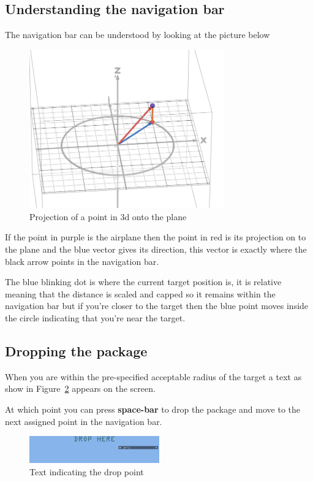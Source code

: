 \subsection{Understanding the navigation bar}
The navigation bar can be understood by looking at the picture below
\begin{figure}[H]
    \centering
    \includegraphics[width=0.75\textwidth]{images/figure1.png}
    \caption{Projection of a point in 3d onto the plane}
    \label{fig:projection}
\end{figure}


If the point in purple is the airplane then the point in red is its projection on to the plane and the blue vector gives its direction, this vector is exactly where the black arrow points in the navigation bar.

The blue blinking dot is where the current target position is, it is relative meaning that the distance is scaled and capped so it remains within the navigation bar but if you're closer to the target then the blue point moves inside the circle indicating that you're near the target.


\subsection{Dropping the package}

When you are within the pre-specified acceptable radius of the target a text as show in Figure~\ref{fig:drop_text} appears on the screen.

At which point you can press \textbf{space-bar} to drop the package and move to the next assigned point in the navigation bar.


\begin{figure}[H]
    \centering
    \includegraphics[width=0.5\textwidth]{images/figure2.png}
    \caption{Text indicating the drop point}
    \label{fig:drop_text}
\end{figure}



